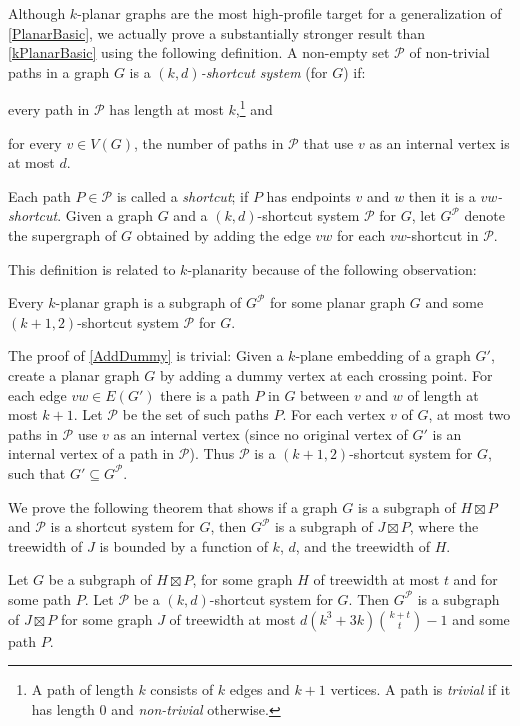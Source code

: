 \documentclass{patmorin}
\newcommand{\PP}{\mathcal{P}}
\begin{document}
Although $k$-planar graphs are the most high-profile target for a generalization of \cref{PlanarBasic}, we actually prove a substantially stronger result than \cref{kPlanarBasic} using the following definition. A non-empty set $\mathcal{P}$ of non-trivial paths in a graph $G$ is a \emph{$(k,d)$-shortcut system} (for $G$) if:
\begin{compactitem}
\item every path in $\mathcal{P}$ has length at most $k$,\footnote{A path of length $k$ consists of $k$ edges and $k+1$ vertices.  A path is \emph{trivial} if it has length 0 and \emph{non-trivial} otherwise.} and
\item for every $v\in V(G)$, the number of paths in $\mathcal{P}$ that use $v$ as an internal vertex is at most $d$.
\end{compactitem} 
Each path $P\in\mathcal{P}$ is called a \emph{shortcut}; if $P$ has endpoints $v$ and $w$ then it is a \emph{$vw$-shortcut}. Given a graph $G$ and a $(k,d)$-shortcut system $\mathcal{P}$ for $G$, let $G^{\mathcal{P}}$ denote the supergraph of $G$ obtained by adding the edge $vw$ for each $vw$-shortcut in $\mathcal{P}$. 

This definition is related to $k$-planarity because of the following observation:

\begin{obs}
\label{AddDummy}
Every $k$-planar graph is a subgraph of $G^\PP$ for some planar graph $G$ and some $(k+1,2)$-shortcut system $\PP$ for $G$. 
\end{obs}

The proof of \cref{AddDummy} is trivial: Given a $k$-plane embedding of a graph $G'$, create a planar graph $G$ by adding a dummy vertex at each crossing point. For each edge $vw\in E(G')$ there is a path $P$ in $G$ between $v$ and $w$ of length at most $k+1$. Let $\PP$ be the set of such paths $P$. For each vertex $v$ of $G$, at most two paths in $\PP$ use $v$ as an internal vertex (since no original vertex of $G'$ is an internal vertex of a path in $\PP$). Thus $\PP$ is a $(k+1,2)$-shortcut system for $G$, such that $G'\subseteq G^\PP$. 

We prove the following theorem that shows if a graph $G$ is a subgraph of $H\boxtimes P$ and $\PP$ is a shortcut system for $G$, then $G^{\mathcal{P}}$ is a subgraph of $J\boxtimes P$, where the treewidth of $J$ is bounded by a function of $k$, $d$, and the treewidth of $H$. 

\begin{thm}
\label{ShortcutProduct}
Let $G$ be a subgraph of $H\boxtimes P$, for some graph $H$ of treewidth at most $t$ and for some path $P$. 
Let $\PP$ be a $(k,d)$-shortcut system for $G$. Then $G^\PP$ is a subgraph of $J\boxtimes P$ for some graph $J$ of treewidth at most $d(k^3+3k)\binom{k+t}{t}-1$ and some path $P$. 
\end{thm}
\end{document}
